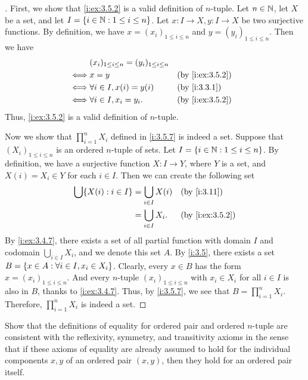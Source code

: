 \begin{proof}[]
  First, we show that \cref{i:ex:3.5.2} is a valid definition of \(n\)-tuple.
  Let \(n \in \mathbb{N}\), let \(X\) be a set, and let \(I = \left\lbrace i \in \mathbb{N} : 1 \leq i \leq n\right\rbrace\).
  Let \(x : I \to X, y : I \to X\) be two surjective functions.
  By definition, we have \(x = (x_i)_{1 \leq i \leq n}\) and \(y = (y_i)_{1 \leq i \leq n}\).
  Then we have
  \begin{align*}
         & (x_i)_{1 \leq i \leq n} = (y_i)_{1 \leq i \leq n}                      \\
    \iff & x = y                                             &  & \by{i:ex:3.5.2} \\
    \iff & \forall i \in I, x(i) = y(i)                      &  & \by{i:3.3.1}    \\
    \iff & \forall i \in I, x_i = y_i.                       &  & \by{i:ex:3.5.2}
  \end{align*}
  Thus, \cref{i:ex:3.5.2} is a valid definition of \(n\)-tuple.

  Now we show that \(\prod_{i = 1}^n X_i\) defined in \cref{i:3.5.7} is indeed a set.
  Suppose that \((X_i)_{1 \leq i \leq n}\) is an ordered \(n\)-tuple of sets.
  Let \(I = \left\lbrace i \in \mathbb{N} : 1 \leq i \leq n\right\rbrace\).
  By definition, we have a surjective function \(X : I \to Y\), where \(Y\) is a set, and \(X(i) = X_i \in Y\) for each \(i \in I\).
  Then we can create the following set
  \begin{align*}
    \bigcup \set{X(i) : i \in I} & = \bigcup_{i \in I} X(i) &  & \by{i:3.11}     \\
                                 & = \bigcup_{i \in I} X_i. &  & \by{i:ex:3.5.2}
  \end{align*}
  By \cref{i:ex:3.4.7}, there exists a set of all partial function with domain \(I\) and codomain \(\bigcup_{i \in I} X_i\), and we denote this set \(A\).
  By \cref{i:3.5}, there exists a set \(B = \left\lbrace x \in A : \forall i \in I, x_i \in X_i\right\rbrace\).
  Clearly, every \(x \in B\) has the form \(x = (x_i)_{1 \leq i \leq n}\).
  And every \(n\)-tuple \((x_i)_{1 \leq i \leq n}\) with \(x_i \in X_i\) for all \(i \in I\) is also in \(B\), thanks to \cref{i:ex:3.4.7}.
  Thus, by \cref{i:3.5.7}, we see that \(B = \prod_{i = 1}^n X_i\).
  Therefore, \(\prod_{i = 1}^n X_i\) is indeed a set.
\end{proof}

\begin{ex}\label{i:ex:3.5.3}
  Show that the definitions of equality for ordered pair and ordered \(n\)-tuple are consistent with the reflexivity, symmetry, and transitivity axioms in the sense that if these axioms of equality are already assumed to hold for the individual components \(x, y\) of an ordered pair \((x, y)\), then they hold for an ordered pair itself.
\end{ex}

